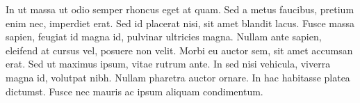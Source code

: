 \documentclass[12pt,letterpaper,english]{article}
\begin{document}
In ut massa ut odio semper rhoncus eget at quam. Sed a metus faucibus, pretium enim nec, imperdiet erat. Sed id placerat nisi, sit amet blandit lacus. Fusce massa sapien, feugiat id magna id, pulvinar ultricies magna. Nullam ante sapien, eleifend at cursus vel, posuere non velit. Morbi eu auctor sem, sit amet accumsan erat. Sed ut maximus ipsum, vitae rutrum ante. In sed nisi vehicula, viverra magna id, volutpat nibh. Nullam pharetra auctor ornare. In hac habitasse platea dictumst. Fusce nec mauris ac ipsum aliquam condimentum.
\end{document}
